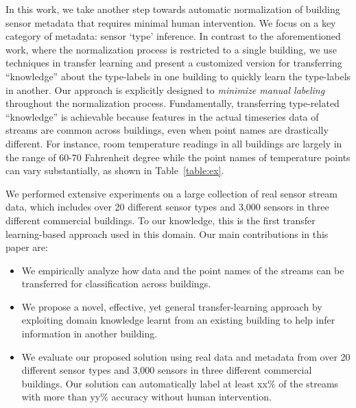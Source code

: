 In this work, we take another step towards automatic normalization of building 
sensor metadata that requires minimal human intervention. We focus on a key category 
of metadata: sensor `type' inference. In contrast to the aforementioned work, 
where the normalization process is restricted to a single building, 
we use techniques in transfer learning and present a customized version for transferring 
``knowledge'' about the type-labels in one building to quickly learn the type-labels in another.
Our approach is explicitly designed to \emph{minimize manual labeling} throughout the normalization process.
Fundamentally, transferring type-related ``knowledge'' is achievable because
features in the actual timeseries data of streams are common 
across buildings, even when point names are drastically different. For instance, room temperature 
readings in all buildings are largely in the range of 60-70 Fahrenheit degree while 
the point names of temperature points can vary substantially, as shown in
Table~\ref{table:ex}.

We performed extensive experiments on a large 
collection of real sensor stream data, which includes over 20 different sensor types 
and 3,000 sensors in three different commercial buildings. To our knowledge, this is the first 
transfer learning-based approach used in this domain.  Our main 
contributions in this paper are:

\begin{itemize}\itemsep1pt \parskip1pt 
\item We empirically analyze how data and the point names of the streams can be transferred for classification across buildings.
\item We propose a novel, effective, yet general transfer-learning approach by exploiting domain knowledge learnt from an existing building to help infer information in another building.
\item We evaluate our proposed solution using real data and metadata from over 20 different sensor types and 3,000 sensors in three different commercial buildings.  Our solution can automatically label at least xx\% of the streams with more than yy\% accuracy without human intervention.
\end{itemize}
